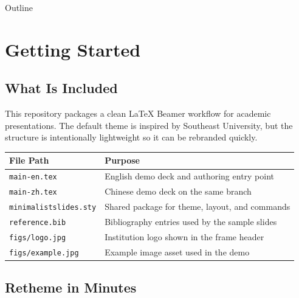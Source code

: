 \documentclass[8pt]{beamer}
\begin{document}
\makeboxedcover
\makelinecover

\begin{frame}{Outline}
    \tableofcontents
\end{frame}

\section{Getting Started}

\makesection

\subsection{What Is Included}

\begin{frame}[fragile]{\insertsection}{\insertsubsection}

    This repository packages a clean \LaTeX{} Beamer workflow for academic presentations. The default theme is inspired by Southeast University, but the structure is intentionally lightweight so it can be rebranded quickly.

    \begin{table}
        \small
        \renewcommand{\arraystretch}{1.4}
        \centering
        \begin{tabular}{ll}
            \toprule
            File Path & Purpose \\
            \midrule
            \lstinline|main-en.tex| & English demo deck and authoring entry point \\
            \lstinline|main-zh.tex| & Chinese demo deck on the same branch \\
            \lstinline|minimalistslides.sty| & Shared package for theme, layout, and commands \\
            \lstinline|reference.bib| & Bibliography entries used by the sample slides \\
            \lstinline|figs/logo.jpg| & Institution logo shown in the frame header \\
            \lstinline|figs/example.jpg| & Example image asset used in the demo \\
            \bottomrule
        \end{tabular}
    \end{table}

\end{frame}

\subsection{Retheme in Minutes}
\end{document}
